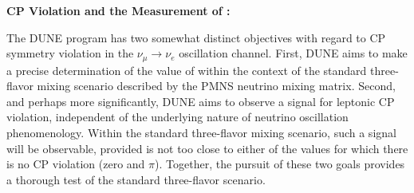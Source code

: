 \textbf{CP Violation and the Measurement of {\boldmath \deltacp}:}

The DUNE program has two somewhat distinct objectives with regard to
CP symmetry violation in the $\nu_\mu \to \nu_e$ oscillation channel.
First, DUNE aims to make a precise determination of the value of
\deltacp within the context of the standard three-flavor mixing
scenario described by the PMNS neutrino mixing matrix.  Second, and perhaps more significantly,
DUNE aims to observe a signal for leptonic CP violation, independent
of the underlying nature of neutrino oscillation phenomenology.
Within the standard three-flavor mixing scenario, such a signal will
be observable, provided \deltacp is not too close to either of the
values for which there is no CP violation (zero and $\pi$).  Together,
the pursuit of these two goals provides a thorough test of the
standard three-flavor scenario.

